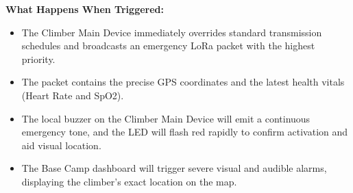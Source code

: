 \textbf{What Happens When Triggered:}
\begin{itemize}
    \item The Climber Main Device immediately overrides standard transmission schedules and broadcasts an emergency LoRa packet with the highest priority.
    \item The packet contains the precise GPS coordinates and the latest health vitals (Heart Rate and SpO2).
    \item The local buzzer on the Climber Main Device will emit a continuous emergency tone, and the LED will flash red rapidly to confirm activation and aid visual location.
    \item The Base Camp dashboard will trigger severe visual and audible alarms, displaying the climber's exact location on the map.
\end{itemize}
